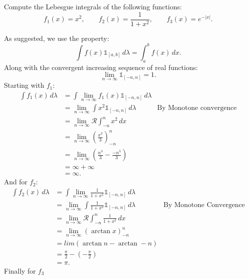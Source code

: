 \documentclass{article}
\newtheorem[M]{exe}{Exercise}
\begin{document}
\begin{exe}
    Compute the Lebesgue integrals of the following functions:
    \[
    f_1(x)=x^2,\qquad f_2(x)=\frac{1}{1+x^2},\qquad f_3(x)=e^{-|x|}
    .\] 
\end{exe}
As suggested, we use the property:
\[
    \int f(x)\mathbb{1}_{[a,b]} \, d\lambda= \int_{a}^{b} f(x) \, d x 
.\] 
Along with the convergent increasing sequence of real functions:
\[
    \lim_{n \to \infty} \mathbb{1}_{[-n,n]}=1
.\] 
Starting with $f_1$:
\begin{align*}
    \int f_1(x) \, d\lambda&= \int \lim_{n \to \infty} f_1(x)\mathbb{1}_{[-n,n]} \, d\lambda  \\ 
                           &= \lim_{n \to \infty} \int x^2\mathbb{1}_{[-n,n]} \, d\lambda &\text{By Monotone convergence}  \\
                           &= \lim_{n \to \infty} {\mathcal{R}}\int_{-n}^{n} x^2 \, d x \\
                           &= \lim_{n \to \infty} \left( \frac{x^3}{3} \right) ^{n}_{-n} \\
                           &= \lim_{n \to \infty} \left( \frac{n^3}{3}- \frac{-n^3}{3} \right)  \\
                           &= \infty+\infty \\
                           &=\infty
.\end{align*}
And for $f_2$:
\begin{align*}
    \int f_2(x) \, d\lambda&= \int \lim_{n \to \infty} \frac{1}{1+x^2} \mathbb{1}_{[-n,n]}\, d\lambda  \\ 
                           &= \lim_{n \to \infty} \int \frac{1}{1+x^2}\mathbb{1}_{[-n,n]} \, d\lambda &\text{By Monotone Convergence} \\
                           &= \lim_{n \to \infty} \mathcal{R}\int_{-n}^{n} \frac{1}{1+x^2} \, d x  \\
                           &= \lim_{n \to \infty} \left( \arctan x \right) ^{n}_{-n} \\
                           &= lim\left( \arctan n - \arctan -n \right)  \\
                           &= \frac{\pi}{2} - \left( -\frac{\pi}{2} \right)  \\
                           &=\pi
.\end{align*}
Finally for $f_3$
\end{document}
